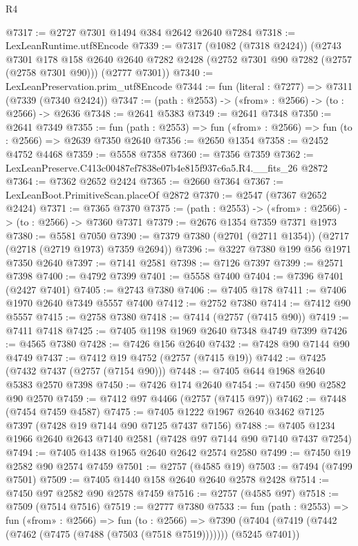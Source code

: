 \begin{lexlean}{R4}
\begin{coremodule}
@7317 := @2727 @7301 @1494 @384 @2642 @2640 @7284
@7318 := LexLeanRuntime.utf8Encode
@7339 := @7317
    (@1082 (@7318 @2424))
    (@2743
      @7301
      @178
      @158
      @2640
      @2640
      @7282
      @2428
      (@2752 @7301 @90 @7282 (@2757 (@2758 @7301 @90)))
      (@2777 @7301))
@7340 := LexLeanPreservation.prim_utf8Encode
@7344 := fun (literal : @7277) => @7311 (@7339 (@7340 @2424))
@7347 := (path : @2553) -> («from» : @2566) -> (to : @2566) -> @2636
@7348 := @2641 @5383
@7349 := @2641 @7348
@7350 := @2641 @7349
@7355 := fun (path : @2553) => fun («from» : @2566) => fun (to : @2566) => @2639 @7350 @2640
@7356 := @2650 @1354
@7358 := @2452 @4752 @4468
@7359 := @5558 @7358
@7360 := @7356 @7359
@7362 := LexLeanPreserve.C413c00487ef7838e07b4e815f937c6a5.R4.__fits_26 @2872
@7364 := @7362 @2652 @2424
@7365 := @2660 @7364
@7367 := LexLeanBoot.PrimitiveScan.placeOf @2872
@7370 := @2547 (@7367 @2652 @2424)
@7371 := @7365 @7370
@7375 := (path : @2553) -> («from» : @2566) -> (to : @2566) -> @7360 @7371
@7379 := @2676 @1354 @7359 @7371 @1973
@7380 := @5581 @7050
@7390 := @7379 @7380 (@2701 (@2711 @1354)) (@2717 (@2718 (@2719 @1973) @7359 @2694))
@7396 := @3227 @7380 @199 @56 @1971 @7350 @2640
@7397 := @7141 @2581
@7398 := @7126 @7397
@7399 := @2571 @7398
@7400 := @4792 @7399
@7401 := @5558 @7400
@7404 := @7396 @7401 (@2427 @7401)
@7405 := @2743 @7380
@7406 := @7405 @178
@7411 := @7406 @1970 @2640 @7349 @5557 @7400
@7412 := @2752 @7380
@7414 := @7412 @90 @5557
@7415 := @2758 @7380
@7418 := @7414 (@2757 (@7415 @90))
@7419 := @7411 @7418
@7425 := @7405 @1198 @1969 @2640 @7348 @4749 @7399
@7426 := @4565 @7380
@7428 := @7426 @156 @2640
@7432 := @7428 @90 @7144 @90 @4749
@7437 := @7412 @19 @4752 (@2757 (@7415 @19))
@7442 := @7425 (@7432 @7437 (@2757 (@7154 @90)))
@7448 := @7405 @644 @1968 @2640 @5383 @2570 @7398
@7450 := @7426 @174 @2640
@7454 := @7450 @90 @2582 @90 @2570
@7459 := @7412 @97 @4466 (@2757 (@7415 @97))
@7462 := @7448 (@7454 @7459 @4587)
@7475 := @7405 @1222 @1967 @2640 @3462 @7125 @7397 (@7428 @19 @7144 @90 @7125 @7437 @7156)
@7488 := @7405 @1234 @1966 @2640 @2643 @7140 @2581 (@7428 @97 @7144 @90 @7140 @7437 @7254)
@7494 := @7405 @1438 @1965 @2640 @2642 @2574 @2580
@7499 := @7450 @19 @2582 @90 @2574 @7459
@7501 := @2757 (@4585 @19)
@7503 := @7494 (@7499 @7501)
@7509 := @7405 @1440 @158 @2640 @2640 @2578 @2428
@7514 := @7450 @97 @2582 @90 @2578 @7459
@7516 := @2757 (@4585 @97)
@7518 := @7509 (@7514 @7516)
@7519 := @2777 @7380
@7533 := fun (path : @2553) =>
  fun («from» : @2566) =>
  fun (to : @2566) =>
  @7390 (@7404 (@7419 (@7442 (@7462 (@7475 (@7488 (@7503 (@7518 @7519))))))) (@5245 @7401))

\end{coremodule}
\end{lexlean}
